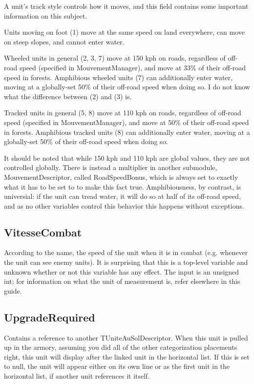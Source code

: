 \documentclass{article}
\begin{document}
A unit's track style controls how it moves, and this field contains some important information on this subject.

Units moving on foot (1) move at the same speed on land everywhere, can move on steep slopes, and cannot enter water. 

Wheeled units in general (2, 3, 7) move at 150 kph on roads, regardless of off-road speed (specified in MouvementManager), and move at 33\% of their off-road speed in forests. Amphibious wheeled units (7) can additionally enter water, moving at a globally-set 50\% of their off-road speed when doing so. I do not know what the difference between (2) and (3) is.

Tracked units in general (5, 8) move at 110 kph on roads, regardless of off-road speed (specified in MouvementManager), and move at 50\% of their off-road speed in forests. Amphibious tracked units (8) can additionally enter water, moving at a globally-set 50\% of their off-road speed when doing so.

It should be noted that while 150 kph and 110 kph are global values, they are not controlled globally. There is instead a multiplier in another submodule, MouvementDescriptor, called RoadSpeedBonus, which is always set to exactly what it has to be set to to make this fact true. Amphibiousness, by contrast, is universial: if the unit can tread water, it will do so at half of its off-road speed, and as no other variables control this behavior this happens without exceptions.

\subsection{VitesseCombat}

According to the name, the speed of the unit when it is in combat (e.g. whenever the unit can see enemy units). It is surprising that this is a top-level variable and unknown whether or not this variable has any effect. The input is an unsigned int; for information on what the unit of measurement is, refer elsewhere in this guide.

\subsection{UpgradeRequired}

Contains a reference to another TUniteAuSolDescriptor. When this unit is pulled up in the armory, assuming you did all of the other categorization placements right, this unit will display after the linked unit in the horizontal list. If this is set to null, the unit will appear either on its own line or as the first unit in the horizontal list, if another unit references it itself.
\end{document}
